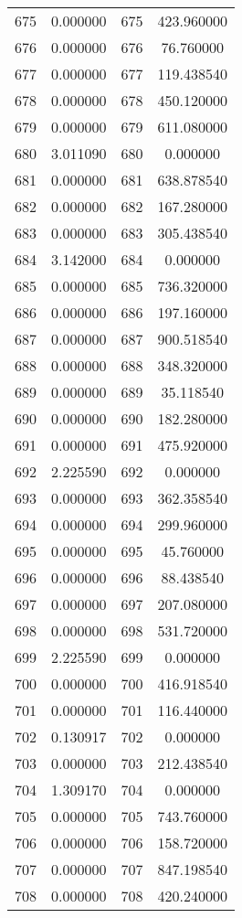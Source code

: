 \documentclass[12pt]{article}
\begin{document}
\begin{longtable}{@{}cccc@{}}
675 & 0.000000 & 675 & 423.960000 \\
676 & 0.000000 & 676 & 76.760000 \\
677 & 0.000000 & 677 & 119.438540 \\
678 & 0.000000 & 678 & 450.120000 \\
679 & 0.000000 & 679 & 611.080000 \\
680 & 3.011090 & 680 & 0.000000 \\
681 & 0.000000 & 681 & 638.878540 \\
682 & 0.000000 & 682 & 167.280000 \\
683 & 0.000000 & 683 & 305.438540 \\
684 & 3.142000 & 684 & 0.000000 \\
685 & 0.000000 & 685 & 736.320000 \\
686 & 0.000000 & 686 & 197.160000 \\
687 & 0.000000 & 687 & 900.518540 \\
688 & 0.000000 & 688 & 348.320000 \\
689 & 0.000000 & 689 & 35.118540 \\
690 & 0.000000 & 690 & 182.280000 \\
691 & 0.000000 & 691 & 475.920000 \\
692 & 2.225590 & 692 & 0.000000 \\
693 & 0.000000 & 693 & 362.358540 \\
694 & 0.000000 & 694 & 299.960000 \\
695 & 0.000000 & 695 & 45.760000 \\
696 & 0.000000 & 696 & 88.438540 \\
697 & 0.000000 & 697 & 207.080000 \\
698 & 0.000000 & 698 & 531.720000 \\
699 & 2.225590 & 699 & 0.000000 \\
700 & 0.000000 & 700 & 416.918540 \\
701 & 0.000000 & 701 & 116.440000 \\
702 & 0.130917 & 702 & 0.000000 \\
703 & 0.000000 & 703 & 212.438540 \\
704 & 1.309170 & 704 & 0.000000 \\
705 & 0.000000 & 705 & 743.760000 \\
706 & 0.000000 & 706 & 158.720000 \\
707 & 0.000000 & 707 & 847.198540 \\
708 & 0.000000 & 708 & 420.240000 \\

\end{longtable}
\end{document}
